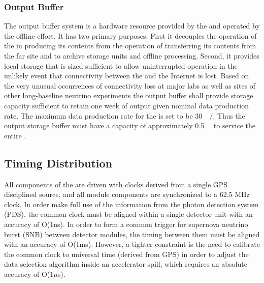 
\subsubsection{Output Buffer}


The output buffer system is a hardware resource provided by the  and operated by the  offline effort. 
It has two primary purposes. 
First it decouples the operation of the  in producing its contents from the operation of transferring its contents from the far site and to archive storage units and offline processing. 
Second, it provides local storage that is sized sufficient to allow uninterrupted  operation in the unlikely event that connectivity between the  and the Internet is lost. 
Based on the very unusual occurrences of connectivity loss at major labs as well as  sites of other long-baseline neutrino experiments the output buffer shall provide storage capacity sufficient to retain one week of output given nominal data production rate. 
The maximum data production rate for the  is set to be \SI{30}{\peta\byte/\year}. 
Thus the output storage buffer must have a capacity of approximately \SI{0.5}{\peta\byte} to service the entire .




\subsection{Timing Distribution}
\label{sec:sp-daq:design-timing}

All components of the  are driven with clocks derived
from a single GPS disciplined source, and all module components
are synchronized to a 62.5 MHz clock. In order make full use of the
information from the photon detection system (PDS), the common clock
must be aligned within a single detector unit with an accuracy of
O(1ns). In order to form a common trigger for supernova neutrino burst
(SNB) between detector modules, the timing between them must be
aligned with an accuracy of O(1ms). However, a tighter constraint is
the need to calibrate the common clock to universal time (derived from
GPS) in order to adjust the data selection algorithm inside an
accelerator spill, which requires an absolute accuracy of O(1$\mu$s).

